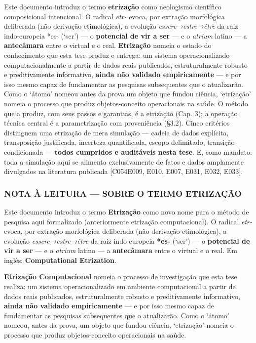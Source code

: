 \documentclass[
  10pt,
]{article}
\begin{document}
Este documento introduz o termo \textbf{etrização} como neologismo
científico composicional intencional. O radical \emph{etr-} evoca, por
extração morfológica deliberada (não derivação etimológica), a evolução
\emph{essere→estre→être} da raiz indo-europeia *es- (`ser') --- o
\textbf{potencial de vir a ser} --- e o \emph{atrium} latino --- a
\textbf{antecâmara} entre o virtual e o real. \textbf{Etrização} nomeia
o estado do conhecimento que esta tese produz e entrega: um sistema
operacionalizado computacionalmente a partir de dados reais publicados,
estruturalmente robusto e preditivamente informativo, \textbf{ainda não
validado empiricamente} --- e por isso mesmo capaz de fundamentar as
pesquisas subsequentes que o atualizarão. Como o `átomo' nomeou antes da
prova um objeto que fundou ciência, `etrização' nomeia o processo que
produz objetos-conceito operacionais na saúde. O método que a produz,
com seus passos e garantias, é a etrização (Cap. 3); a operação técnica
central é a parametrização com proveniência (§3.2). Cinco critérios
distinguem uma etrização de mera simulação --- cadeia de dados
explícita, transposição justificada, incerteza quantificada, escopo
delimitado, transição condicionada --- \textbf{todos cumpridos e
auditáveis nesta tese}. E, como mandato: toda a simulação aqui se
alimenta exclusivamente de fatos e dados amplamente divulgados na
literatura publicada {[}C054\textbar E009, E010, E007, E031, E032,
E033{]}.

\hypertarget{nota-uxe0-leitura-sobre-o-termo-etrizauxe7uxe3o-1}{%
\subsubsection{NOTA À LEITURA --- SOBRE O TERMO
ETRIZAÇÃO}\label{nota-uxe0-leitura-sobre-o-termo-etrizauxe7uxe3o-1}}

Este documento introduz o termo \textbf{Etrização} como novo nome para o
método de pesquisa aqui formalizado (anteriormente etrização
computacional). O radical \emph{etr-} evoca, por extração morfológica
deliberada (não derivação etimológica), a evolução
\emph{essere→estre→être} da raiz indo-europeia \textbf{*es-} (`ser') ---
o \textbf{potencial de vir a ser} --- e o \emph{atrium} latino --- a
\textbf{antecâmara} entre o virtual e o real. Em inglês:
\textbf{Computational Etrization}.

\textbf{Etrização Computacional} nomeia o processo de investigação que
esta tese realiza: um sistema operacionalizado em ambiente computacional
a partir de dados reais publicados, estruturalmente robusto e
preditivamente informativo, \textbf{ainda não validado empiricamente}
--- e por isso mesmo capaz de fundamentar as pesquisas subsequentes que
o atualizarão. Como o `átomo' nomeou, antes da prova, um objeto que
fundou ciência, `etrização' nomeia o processo que produz
objetos-conceito operacionais na saúde.
\end{document}
